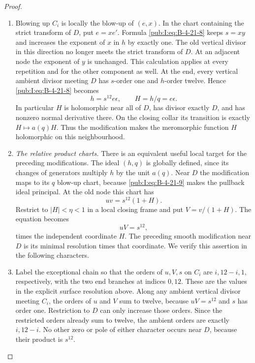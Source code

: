 \begin{proof}
\begin{enumerate}[label=\arabic*.,leftmargin=*]
\item Blowing up $C_i$ is locally the blow-up of $(e,x)$.
In the chart containing the strict transform of $D$, put
$e=xe'$.  Formula \eqref{pub:I:eq:B-4-21-8} keeps $s=xy$ and increases
the exponent of $x$ in $h$ by exactly one.  The old vertical
divisor in this direction no longer meets the strict transform
of $D$.  At an adjacent node the exponent of $y$ is unchanged.
This calculation applies at every repetition and for the
other component as well.  At the end, every vertical ambient
divisor meeting $D$ has $s$-order one and $h$-order twelve.
Hence \eqref{pub:I:eq:B-4-21-8} becomes
\begin{equation}
 h=s^{12}e\epsilon,
 \qquad H=h/q=e\epsilon.
\label{pub:I:eq:B-4-21-9}
\end{equation}
In particular $H$ is holomorphic near all of $D$, has divisor
exactly $D$, and has nonzero normal derivative there.  On the
closing collar its transition is exactly $H\mapsto a(q)H$.
Thus the modification makes the meromorphic function $H$
holomorphic on this neighbourhood.

\item \emph{The relative product charts.}
There is an equivalent useful local target for the preceding
modifications.  The ideal $(h,q)$ is globally defined, since
its changes of generators multiply $h$ by the unit $a(q)$.
Near $D$ the modification maps to its $q$ blow-up chart,
because \eqref{pub:I:eq:B-4-21-9} makes the pullback ideal principal.
At the old node this chart has
\[
 uv=s^{12}(1+H).
\]
Restrict to $|H|<\eta<1$ in a local closing frame and put
$V=v/(1+H)$.  The equation becomes
\[
 uV=s^{12},
\]
times the independent coordinate $H$.
The preceding smooth modification near $D$ is its minimal
resolution times that coordinate.  We verify this assertion
in the following characters.

\item Label the exceptional chain so that the orders of $u,V,s$
on $C_i$ are $i,12-i,1$, respectively, with the two end
branches at indices $0,12$.  These are the values in the
explicit surface resolution above.  Along any ambient vertical
divisor meeting $C_i$, the orders of $u$ and $V$ sum to twelve,
because $uV=s^{12}$ and $s$ has order one.  Restriction to
$D$ can only increase those orders.  Since the restricted
orders already sum to twelve, the ambient orders are exactly
$i,12-i$.  No other zero or pole of either character occurs
near $D$, because their product is $s^{12}$.


\end{enumerate}
\end{proof}
